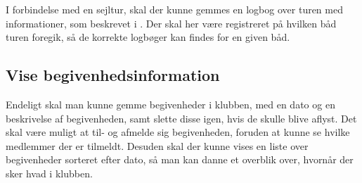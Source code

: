 I forbindelse med en sejltur, skal der kunne gemmes en logbog over turen med informationer, som beskrevet i .
Der skal her være registreret på hvilken båd turen foregik, så de korrekte logbøger kan findes for en given båd.

\subsection{Vise begivenhedsinformation}

Endeligt skal man kunne gemme begivenheder i klubben, med en dato og en beskrivelse af begivenheden, samt slette disse igen, hvis de skulle blive aflyst. 
Det skal være muligt at til- og afmelde sig begivenheden, foruden at kunne se hvilke medlemmer der er tilmeldt.
Desuden skal der kunne vises en liste over begivenheder sorteret efter dato, så man kan danne et overblik over, hvornår der sker hvad i klubben.
